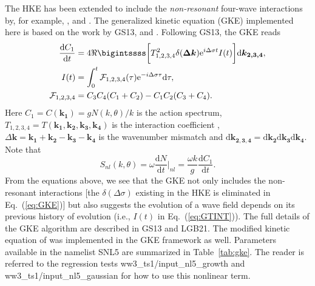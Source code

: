 The HKE has been extended to include the \emph{non-resonant} four-wave
interactions by, for example, \citet{Janssen2003}, \citet{Annenkov2006} and
\citet[][hereafter GS13]{Gramstad2013}. The generalized kinetic equation (GKE)
implemented here is based on the work by GS13, \citet{Gramstad2016} and
\citet[][hereafter LGB21]{Liu2021JFM}. Following GS13, the GKE reads
%
\begin{align}
\frac{\mathrm{d} C_1}{\mathrm{d} t} &= 4 \Re \bigintssss \bigg[ T^2_{1, 2, 3, 4} \delta (\boldsymbol{\Delta k}) \/\mathrm{e}^{i\Delta \sigma t} I(t) \/  \bigg] \mathrm{d} \boldsymbol{k_{2, 3, 4}}, \label{eq:GKE}\\
%
I(t) &= \int_{0}^{t} \mathcal{F}_{1, 2, 3, 4} (\tau) \mathrm{e}^{-i\Delta \sigma \tau } \mathrm{d} \tau, \label{eq:GTINT}\\
%
\mathcal{F}_{1, 2, 3, 4} &= C_3 C_4 (C_1 + C_2) - C_1 C_2 (C_3 + C_4). \label{eq:GPROD}
\end{align}
%
Here $C_1 = C(\boldsymbol{k_1}) = g N(k, \theta) / k$ is the action spectrum,
$T_{1, 2, 3, 4} = T(\boldsymbol{k_1}, \boldsymbol{k_2}, \boldsymbol{k_3}, \boldsymbol{k_4})$
is the interaction coefficient \citep{art:Kra94, art:Jan09},
$\Delta \boldsymbol{k} = \boldsymbol{k_1} + \boldsymbol{k_2} - \boldsymbol{k_3} - \boldsymbol{k_4}$
is the wavenumber mismatch and $\mathrm{d} \boldsymbol{k_{2,3,4}} = \mathrm{d} \boldsymbol{k_2} \mathrm{d} \boldsymbol{k_3} \mathrm{d} \boldsymbol{k_4}$.
Note that
\begin{equation}
S_{nl}(k, \theta) = \omega \frac{\mathrm{d} N}{\mathrm{d}t} \bigg\rvert_{nl} = \frac{\omega k}{g} \frac{\mathrm{d} C_1}{\mathrm{d} t}.
\label{eq:GSnl}
\end{equation}
From the equations above, we see that the GKE not only includes the non-resonant
interactions [the $\delta (\Delta \sigma)$ existing in the HKE is eliminated in
Eq.~(\ref{eq:GKE})] but also suggests the evolution of a wave field depends
on its previous history of evolution (i.e., $I(t)$ in Eq.~(\ref{eq:GTINT})).
The full details of the GKE algorithm are described in GS13 and LGB21.
The modified kinetic equation of \citet{Janssen2003} was
implemented in the GKE framework as well. Parameters available in the
namelist {\F SNL5} are summarized in Table~\ref{tab:gke}. The reader is
referred to the regression tests {\code ww3\_ts1/input\_nl5\_growth} and
{\code ww3\_ts1/input\_nl5\_gaussian} for how to use this nonlinear term.

